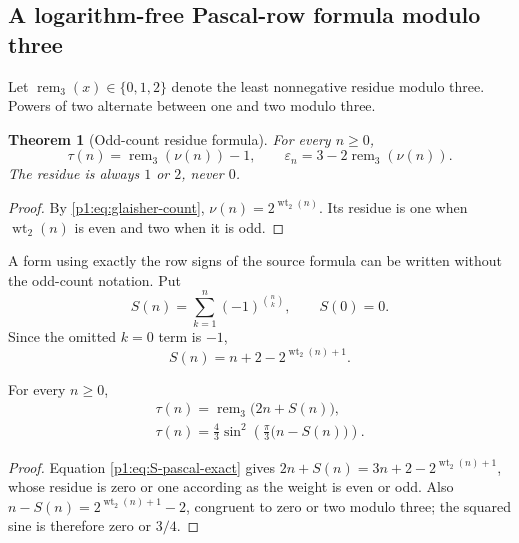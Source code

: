 \documentclass[11pt,oneside]{article}
\numberwithin{equation}{section}
\newtheorem{theorem}{Theorem}[section]
\theoremstyle{definition}
\theoremstyle{remark}
\newcommand{\wt}{\operatorname{wt}_2}
\newcommand{\eps}{\varepsilon}
\begin{document}
\subsection{A logarithm-free Pascal-row formula modulo three}
\label{p1:sec:mod-three}

Let \(\operatorname{rem}_3(x)\in\{0,1,2\}\) denote the least nonnegative
residue modulo three.  Powers of two alternate between one and two modulo
three.

\begin{theorem}[Odd-count residue formula]
\label{p1:thm:mod-three}
For every \(n\ge0\),
\begin{equation}
  \boxed{
  \tau(n)=\operatorname{rem}_3(\nu(n))-1,
  \qquad
  \eps_n=3-2\operatorname{rem}_3(\nu(n)).}
  \label{p1:eq:odd-count-mod3}
\end{equation}
The residue is always \(1\) or \(2\), never \(0\).
\end{theorem}

\begin{proof}
By \eqref{p1:eq:glaisher-count}, \(\nu(n)=2^{\wt(n)}\).  Its residue is one when
\(\wt(n)\) is even and two when it is odd.
\end{proof}

A form using exactly the row signs of the source formula can be written without
the odd-count notation.  Put
\begin{equation}
  S(n)=\sum_{k=1}^{n}(-1)^{\binom nk},
  \qquad S(0)=0.
  \label{p1:eq:S-pascal}
\end{equation}
Since the omitted \(k=0\) term is \(-1\),
\begin{equation}
  S(n)=n+2-2^{\wt(n)+1}.
  \label{p1:eq:S-pascal-exact}
\end{equation}

\begin{corollary}
\label{p1:cor:mod-three-sine}
For every \(n\ge0\),
\begin{align}
  \boxed{
  \tau(n)=\operatorname{rem}_3\bigl(2n+S(n)\bigr),}
  \label{p1:eq:pascal-mod3}\\
  \boxed{
  \tau(n)=\frac43\sin^2\!\left(
     \frac\pi3\bigl(n-S(n)\bigr)
  \right).}
  \label{p1:eq:pascal-sine}
\end{align}
\end{corollary}

\begin{proof}
Equation \eqref{p1:eq:S-pascal-exact} gives
\(2n+S(n)=3n+2-2^{\wt(n)+1}\), whose residue is zero or one according as the
weight is even or odd.  Also
\(n-S(n)=2^{\wt(n)+1}-2\), congruent to zero or two modulo three; the squared
sine is therefore zero or \(3/4\).
\end{proof}
\end{document}
